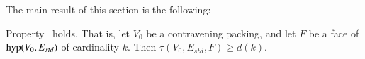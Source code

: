 The main result of this section is the following:



\begin{lemma}\label{lemma:main} %
Property~ holds.  That is,
let $V_0$ be a contravening packing, and  let $F$ be a
face of ${\operatorname{hyp}}(V_0,E_{std})$ of cardinality $k$.  Then
        $\tau(V_0,E_{std},F) \ge d(k)$.
\end{lemma}
%
%

%






%
%



